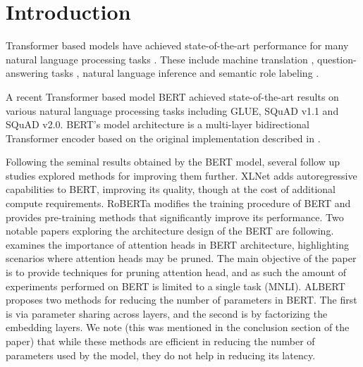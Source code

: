 \documentclass[11pt,a4paper]{article}
\begin{document}
\section{Introduction}
Transformer \citep{vaswani2017attention} based models have achieved state-of-the-art performance for many natural language processing tasks \citep{dai2015semi, peters2018deep, radford2018improving, howard2018universal}. These include machine translation \citep{vaswani2017attention, ott2018scaling}, question-answering tasks \citep{devlin2018bert}, natural language inference \citep{bowman2015large, williams2017broad} and semantic role labeling \citep{strubell2018linguistically}. 

A recent Transformer based model BERT \citep{devlin2018bert} achieved state-of-the-art results on various natural language processing tasks including GLUE, SQuAD v1.1 and SQuAD v2.0. BERT's model architecture is a multi-layer bidirectional Transformer 
encoder based on the original implementation described in \citet{vaswani2017attention}. 


Following the seminal results obtained by the BERT model, several follow up studies explored methods for improving them further. XLNet \citep{yang2019xlnet} adds autoregressive capabilities to BERT, improving its quality, though at the cost of additional compute requirements. RoBERTa \citep{liu2019roberta} modifies the training procedure of BERT and provides pre-training methods that significantly improve its performance. Two notable papers exploring the architecture design of the BERT are following. \citet{michel2019sixteen} examines the importance of attention heads in BERT architecture, highlighting scenarios where attention heads may be pruned. The main objective of the paper is to provide techniques for pruning attention head, and as such the amount of experiments performed on BERT is limited to a single task (MNLI). ALBERT \citep{lan2019albert} proposes two methods for reducing the number of parameters in BERT. The first is via parameter sharing across layers, and the second is by factorizing the embedding layers. We note (this was mentioned in the conclusion section of the paper) that while these methods are efficient in reducing the number of parameters used by the model, they do not help in reducing its latency. 
\end{document}
